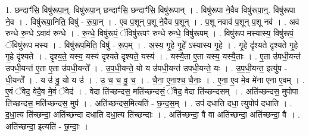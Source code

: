 \documentclass[17pt]{extarticle}
\begin{document}
1. छन्दाꣳ॑सि॒ विषु॑रूपा॒न्॒. विषु॑रूपा॒न् छन्दाꣳ॑सि॒ छन्दाꣳ॑सि॒ विषु॑रूपान् । . विषु॑रूपा ने॒वैव विषु॑रूपा॒न्॒. विषु॑रूपा ने॒व । . विषु॑रूपा॒निति॒ विषु॑ - रू॒पा॒न् । . ए॒व प॒शून् प॒शू ने॒वैव प॒शून् । . प॒शू नवाव॑ प॒शून् प॒शू नव॑ । . अव॑ रुन्धे रु॒न्धे ऽवाव॑ रुन्धे । . रु॒न्धे॒ विषु॑रूपं॒ ॅविषु॑रूपꣳ रुन्धे रुन्धे॒ विषु॑रूपम् । . विषु॑रूप मस्यास्य॒ विषु॑रूपं॒ ॅविषु॑रूप मस्य । . विषु॑रूप॒मिति॒ विषु॑ - रू॒प॒म् । . अ॒स्य॒ गृ॒हे गृ॒हे᳚ ऽस्यास्य गृ॒हे । . गृ॒हे दृ॑श्यते दृश्यते गृ॒हे गृ॒हे दृ॑श्यते । . दृ॒श्य॒ते॒ यस्य॒ यस्य॑ दृश्यते दृश्यते॒ यस्य॑ । . यस्यै॒ता ए॒ता यस्य॒ यस्यै॒ताः । . ए॒ता उ॑पधी॒यन्त॑ उपधी॒यन्त॑ ए॒ता ए॒ता उ॑पधी॒यन्ते᳚ । . उ॒प॒धी॒यन्ते॒ यो य उ॑पधी॒यन्त॑ उपधी॒यन्ते॒ यः । . उ॒प॒धी॒यन्त॒ इत्यु॑प - धी॒यन्ते᳚ । . य उ॑ वु॒ यो य उ॑ । . उ॒ च॒ च॒ वु॒ च॒ । . चै॒ना॒ ए॒ना॒श्च॒ चै॒नाः॒ । . ए॒ना॒ ए॒व मे॒व मे॑ना एना ए॒वम् । . ए॒वं ॅवेद॒ वेदै॒व मे॒वं ॅवेद॑ । . वेदा ति॑च्छन्दस॒ मति॑च्छन्दसं॒ ॅवेद॒ वेदा ति॑च्छन्दसम् । . अति॑च्छन्दस॒ मुपोपा ति॑च्छन्दस॒ मति॑च्छन्दस॒ मुप॑ । . अति॑च्छन्दस॒मित्यति॑ - छ॒न्द॒स॒म् । . उप॑ दधाति दधा॒ त्युपोप॑ दधाति । . द॒धा॒त्य ति॑च्छन्दा॒ अति॑च्छन्दा दधाति दधा॒त्य ति॑च्छन्दाः । . अति॑च्छन्दा॒ वै वा अति॑च्छन्दा॒ अति॑च्छन्दा॒ वै । . अति॑च्छन्दा॒ इत्यति॑ - छ॒न्दाः॒ । \newline
\end{document}
